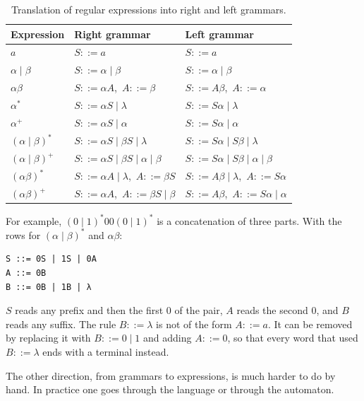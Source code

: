 \begin{table}[h]
\centering
\small
\renewcommand{\arraystretch}{1.15}
\begin{tabular}{l l l}
  \toprule
  Expression & Right grammar & Left grammar \\
  \midrule
  $a$                       & $S ::= a$                                 & $S ::= a$ \\
  $\alpha \mid \beta$       & $S ::= \alpha \mid \beta$                 & $S ::= \alpha \mid \beta$ \\
  $\alpha\beta$             & $S ::= \alpha A$,\ $A ::= \beta$          & $S ::= A\beta$,\ $A ::= \alpha$ \\
  $\alpha^*$                & $S ::= \alpha S \mid \lambda$             & $S ::= S\alpha \mid \lambda$ \\
  $\alpha^+$                & $S ::= \alpha S \mid \alpha$              & $S ::= S\alpha \mid \alpha$ \\
  $(\alpha \mid \beta)^*$   & $S ::= \alpha S \mid \beta S \mid \lambda$ & $S ::= S\alpha \mid S\beta \mid \lambda$ \\
  $(\alpha \mid \beta)^+$   & $S ::= \alpha S \mid \beta S \mid \alpha \mid \beta$ & $S ::= S\alpha \mid S\beta \mid \alpha \mid \beta$ \\
  $(\alpha\beta)^*$         & $S ::= \alpha A \mid \lambda$,\ $A ::= \beta S$ & $S ::= A\beta \mid \lambda$,\ $A ::= S\alpha$ \\
  $(\alpha\beta)^+$         & $S ::= \alpha A$,\ $A ::= \beta S \mid \beta$ & $S ::= A\beta$,\ $A ::= S\alpha \mid \alpha$ \\
  \bottomrule
\end{tabular}
\caption{Translation of regular expressions into right and left grammars.}
\label{tab:regex-grammar}
\end{table}

For example, $(0 \mid 1)^*00(0 \mid 1)^*$ is a concatenation of three parts.
With the rows for $(\alpha \mid \beta)^*$ and $\alpha\beta$:
\begin{lstlisting}
S ::= 0S | 1S | 0A
A ::= 0B
B ::= 0B | 1B | λ
\end{lstlisting}
$S$ reads any prefix and then the first 0 of the pair, $A$ reads the second
0, and $B$ reads any suffix. The rule $B ::= \lambda$ is not of the form $A ::= a$.
It can be removed by replacing it with $B ::= 0 \mid 1$ and adding $A ::= 0$, so
that every word that used $B ::= \lambda$ ends with a terminal instead.

The other direction, from grammars to expressions, is much harder to do by
hand. In practice one goes through the language or through the automaton.

